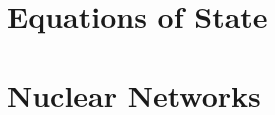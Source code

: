 \documentclass[11pt]{book}
\begin{document}
\chapter{Equations of State}




\chapter{Nuclear Networks}




\backmatter

\renewcommand\bibname{References}


\end{document}

